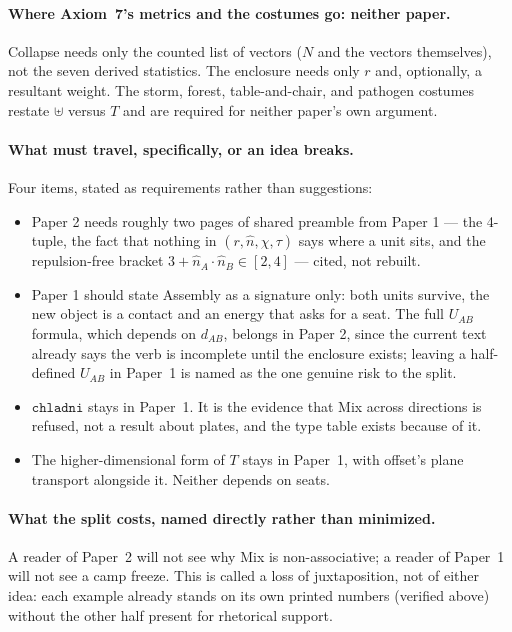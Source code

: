 \documentclass[11pt]{article}
\begin{document}
\paragraph{Where Axiom~7's metrics and the costumes go: neither
paper.} Collapse needs only the counted list of vectors ($N$ and the
vectors themselves), not the seven derived statistics. The enclosure
needs only $r$ and, optionally, a resultant weight. The storm,
forest, table-and-chair, and pathogen costumes restate $\uplus$
versus $T$ and are required for neither paper's own argument.

\paragraph{What must travel, specifically, or an idea breaks.} Four
items, stated as requirements rather than suggestions:
\begin{itemize}
\item Paper 2 needs roughly two pages of shared preamble from Paper 1
--- the 4-tuple, the fact that nothing in $(r,\hat n,\chi,\tau)$
says where a unit sits, and the repulsion-free bracket
$3+\hat n_A\cdot\hat n_B\in[2,4]$ --- cited, not rebuilt.
\item Paper 1 should state Assembly as a signature only: both units
survive, the new object is a contact and an energy that asks for a
seat. The full $U_{AB}$ formula, which depends on $d_{AB}$, belongs
in Paper 2, since the current text already says the verb is
incomplete until the enclosure exists; leaving a half-defined
$U_{AB}$ in Paper~1 is named as the one genuine risk to the split.
\item $\mathtt{chladni}$ stays in Paper~1. It is the evidence that
Mix across directions is refused, not a result about plates, and the
type table exists because of it.
\item The higher-dimensional form of $T$ stays in Paper~1, with
offset's plane transport alongside it. Neither depends on seats.
\end{itemize}

\paragraph{What the split costs, named directly rather than
minimized.} A reader of Paper~2 will not see why Mix is
non-associative; a reader of Paper~1 will not see a camp freeze.
This is called a loss of juxtaposition, not of either idea: each
example already stands on its own printed numbers (verified above)
without the other half present for rhetorical support.
\end{document}

